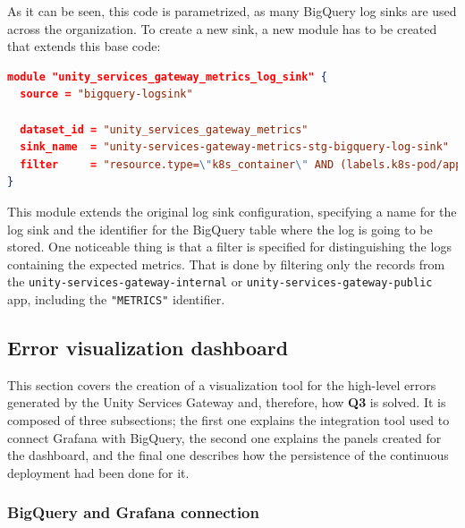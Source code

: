 \documentclass[english, 12pt, a4paper, sci, utf8, a-1b, online]{aaltothesis}
\begin{document}
As it can be seen, this code is parametrized, as many BigQuery log sinks are used across the organization. To create a new sink, a new module has to be created that extends this base code:\\

\begin{lstlisting}[language=json,firstnumber=1]
module "unity_services_gateway_metrics_log_sink" {
  source = "bigquery-logsink"

  dataset_id = "unity_services_gateway_metrics"
  sink_name  = "unity-services-gateway-metrics-stg-bigquery-log-sink"
  filter     = "resource.type=\"k8s_container\" AND (labels.k8s-pod/app=\"unity-services-gateway-public\" OR labels.k8s-pod/app=\"unity-services-gateway-internal\") AND jsonPayload.key=\"METRICS\""
}
\end{lstlisting}

This module extends the original log sink configuration, specifying a name for the log sink and the identifier for the BigQuery table where the log is going to be stored. One noticeable thing is that a filter is specified for distinguishing the logs containing the expected metrics. That is done by filtering only the records from the \texttt{unity-services-gateway-internal} or \texttt{unity-services-gateway-public} app, including the \texttt{"METRICS"} identifier.

\subsection{Error visualization dashboard}



This section covers the creation of a visualization tool for the high-level errors generated by the Unity Services Gateway and, therefore, how \textbf{Q3} is solved. It is composed of three subsections; the first one explains the integration tool used to connect Grafana with BigQuery, the second one explains the panels created for the dashboard, and the final one describes how the persistence of the continuous deployment had been done for it.

\subsubsection{BigQuery and Grafana connection}
\end{document}
